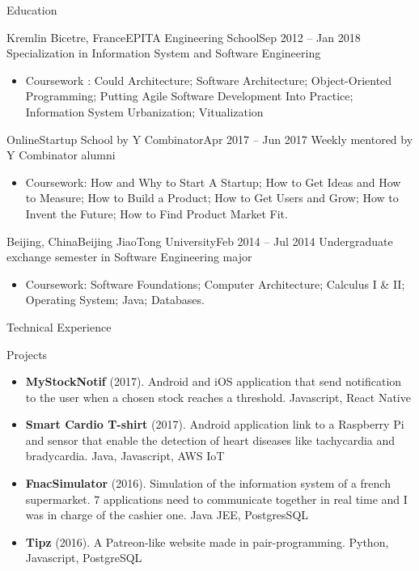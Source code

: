 \documentclass[]{mcdowellcv}
\begin{document}
	
	\begin{cvsection}{Education}
		\begin{cvsubsection}{Kremlin Bicetre, France}{EPITA Engineering School}{Sep 2012 -- Jan 2018}
		Specialization in Information System and Software Engineering
			\begin{itemize}
				\item Coursework : Could Architecture; Software Architecture; Object-Oriented Programming; Putting Agile Software Development Into Practice; Information System Urbanization; Vitualization
			\end{itemize}
		\end{cvsubsection}

		\begin{cvsubsection}{Online}{Startup School by Y Combinator}{Apr 2017 -- Jun 2017}
		Weekly mentored by Y Combinator alumni
			\begin{itemize}
				\item Coursework: How and Why to Start A Startup; How to Get Ideas and How to Measure; How to Build a Product; How to Get Users and Grow; How to Invent the Future; How to Find Product Market Fit.
			\end{itemize}
		\end{cvsubsection}
		
		\begin{cvsubsection}{Beijing, China}{Beijing JiaoTong University}{Feb 2014 -- Jul 2014}
			Undergraduate exchange semester in Software Engineering major
			\begin{itemize}
				\item Coursework: Software Foundations; Computer Architecture; Calculus I \& II; Operating System; Java; Databases.
			\end{itemize}
		\end{cvsubsection}
	\end{cvsection}
	
	\begin{cvsection}{Technical Experience}
		\begin{cvsubsection}{Projects}{}{}
			\begin{itemize}
				\item \textbf{MyStockNotif} (2017). Android and iOS application that send notification to the user when a chosen stock reaches a threshold. Javascript, React Native
				\item \textbf{Smart Cardio T-shirt} (2017). Android application link to a Raspberry Pi and sensor that enable the detection of heart diseases like tachycardia and bradycardia. Java, Javascript, AWS IoT
				\item \textbf{FnacSimulator} (2016). Simulation of the information system of a french supermarket. 7 applications need to communicate together in real time and I was in charge of the cashier one. Java JEE, PostgresSQL
				\item \textbf{Tipz} (2016). A Patreon-like website made in pair-programming. Python, Javascript, PostgreSQL
			\end{itemize}
		\end{cvsubsection}
	\end{cvsection}
	
\end{document}

